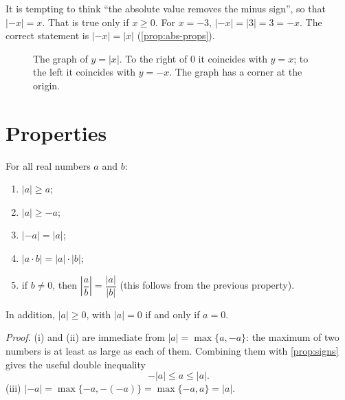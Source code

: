 \begin{warning}
It is tempting to think ``the absolute value removes the minus sign'', so that $|{-x}|=x$. That is true only if
$x\ge0$. For $x=-3$, $|{-x}|=|3|=3=-x$. The correct statement is $|{-x}|=|x|$ (\cref{prop:abs-props}).
\end{warning}

\begin{figure}[ht]
\centering
{}
\caption{The graph of $y=|x|$. To the right of $0$ it coincides with $y=x$; to the left it coincides with
$y=-x$. The graph has a corner at the origin.}
\label{fig:abs-graph}
\end{figure}

\section{Properties}\label{sec:abs-props}

\begin{proposition}
For all real numbers $a$ and $b$: 
\begin{enumerate}[label=(\roman*)]
  \item $|a|\ge a$;
  \item $|a|\ge -a$;
  \item $|{-a}|=|a|$;
  \item $|a\cdot b|=|a|\cdot|b|$;
  \item if $b\ne0$, then $\left|\dfrac ab\right|=\dfrac{|a|}{|b|}$ (this follows from the previous property).
\end{enumerate}
In addition, $|a|\ge0$, with $|a|=0$ if and only if $a=0$.
\end{proposition}
\emph{Proof.} (i) and (ii) are immediate from $|a|=\max\{a,-a\}$: the maximum of two numbers is at least as large
as each of them. Combining them with \cref{prop:signs} gives the useful double inequality
\begin{equation}\label{eq:abs-sandwich}
-|a|\le a\le |a|.
\end{equation}
(iii) $|{-a}|=\max\{-a,-(-a)\}=\max\{-a,a\}=|a|$.

